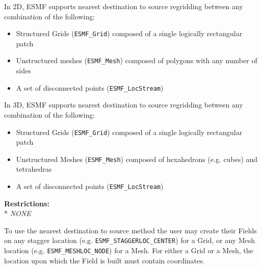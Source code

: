 \smallskip

 In 2D, ESMF supports nearest destination to source regridding between any combination of the following:
 \begin{itemize}
 \item Structured Grids ({\tt ESMF\_Grid}) composed of a single logically rectangular patch
 \item Unstructured meshes ({\tt ESMF\_Mesh}) composed of polygons with any number of sides
 \item A set of disconnected points ({\tt ESMF\_LocStream}) 
 \end{itemize}

\smallskip

 In 3D, ESMF supports nearest destination to source regridding between any combination of the following:
 \begin{itemize}
 \item Structured Grids ({\tt ESMF\_Grid}) composed of a single logically rectangular patch
 \item Unstructured Meshes ({\tt ESMF\_Mesh}) composed of hexahedrons (e.g. cubes) and tetrahedras
 \item A set of disconnected points ({\tt ESMF\_LocStream}) 
 \end{itemize}

\smallskip

\textbf{Restrictions:}\\*
\textit{NONE}

\smallskip

 To use the nearest destination to source method the user may create their Fields on any stagger location (e.g. {\tt ESMF\_STAGGERLOC\_CENTER}) for a Grid, or
 any Mesh location (e.g. {\tt ESMF\_MESHLOC\_NODE}) for a Mesh. For either a Grid or a Mesh, the location upon which the Field is built 
 must contain coordinates. 

